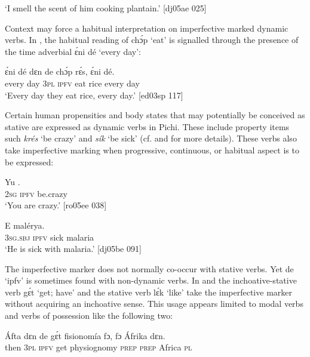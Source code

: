 \glt ‘I smell the scent of him cooking plantain.’ [dj05ae 025]
\z

Context may force a habitual interpretation on imperfective marked dynamic verbs. In , the habitual reading of chɔ́p ‘eat’ is signalled through the presence of the time adverbial ɛ́ni dé ‘every day’:


\ea%
    \label{ex:key:330}
    \gll ɛ́ni    dé  dɛn  de  chɔ́p  rɛ́s,  ɛ́ni    dé.\\
every  day  \textsc{3pl}  \textsc{ipfv}  eat    rice  every  day\\

\glt ‘Every day they eat rice, every day.’ [ed03sp 117]
\z

Certain human propensities and body states that may potentially be conceived as stative are expressed as dynamic verbs in Pichi. These include property items such \textit{krés} ‘be crazy’ and \textit{sík} ‘be sick’ (cf.  and  for more details). These verbs also take imperfective marking when progressive, continuous, or habitual aspect is to be expressed: 


\ea%
    \label{ex:key:331}
    \gll Yu   .\\
\textsc{2sg}  \textsc{ipfv}  be.crazy\\
\glt ‘You are crazy.’ [ro05ee 038]
\z


\ea%
    \label{ex:key:332}
    \gll E       malérya.\\
\textsc{3sg.sbj}  \textsc{ipfv}  sick  malaria\\

\glt ‘He is sick with malaria.’ [dj05be 091]
\z

The imperfective marker does not normally co-occur with stative verbs. Yet de ‘ipfv’ is sometimes found with non-dynamic verbs. In  and  the inchoative-stative verb gɛ́t ‘get; have’ and the stative verb lɛ́k ‘like’ take the imperfective marker without acquiring an inchoative sense. This usage appears limited to modal verbs and verbs of possession like the following two:


\ea%
    \label{ex:key:333}
    \gll \'{A}fta    dɛn  de  gɛ́t  fisionomía    fɔ,  fɔ  \'{A}frika  dɛn.\\
then  \textsc{3pl}  \textsc{ipfv}  get  physiognomy    \textsc{prep}  \textsc{prep}  Africa  \textsc{pl}\\

